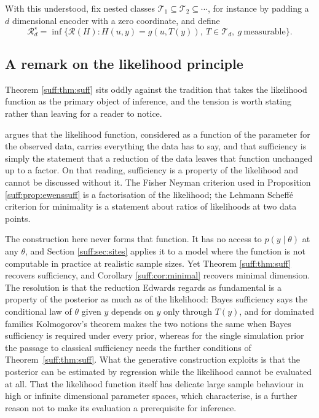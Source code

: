 With this understood, fix nested classes $\mathcal{T}_1\subseteq\mathcal{T}_2\subseteq\cdots$,
for instance by padding a $d$ dimensional encoder with a zero coordinate, and define
\[
\mathcal{R}^\star_d=\inf\{\mathcal{R}(H): H(u,y)=g(u,T(y)),\ T\in\mathcal{T}_d,\ g\
\text{measurable}\}.
\]

\subsection{A remark on the likelihood principle}
\label{suff:sec:edwards}

Theorem \ref{suff:thm:suff} sits oddly against the tradition that takes the likelihood
function as the primary object of inference, and the tension is worth stating rather than
leaving for a reader to notice.

\citet{suff:edwards1972} argues that the likelihood function, considered as a function of the
parameter for the observed data, carries everything the data has to say, and that sufficiency
is simply the statement that a reduction of the data leaves that function unchanged up to a
factor. On that reading, sufficiency is a property of the likelihood and cannot be discussed
without it. The Fisher Neyman criterion used in Proposition \ref{suff:prop:ewenssuff} is a
factorisation of the likelihood; the Lehmann Scheff\'e criterion for minimality is a statement
about ratios of likelihoods at two data points.

The construction here never forms that function. It has no access to $p(y\mid\theta)$ at any
$\theta$, and Section \ref{suff:sec:sites} applies it to a model where the function is not
computable in practice at realistic sample sizes. Yet Theorem \ref{suff:thm:suff} recovers
sufficiency, and Corollary \ref{suff:cor:minimal} recovers minimal dimension. The resolution is
that the reduction Edwards regards as fundamental is a property of the posterior as much as of
the likelihood: Bayes sufficiency says the conditional law of $\theta$ given $y$ depends on
$y$ only through $T(y)$, and for dominated families Kolmogorov's theorem makes the two notions
the same when Bayes sufficiency is required under every prior, whereas for the single simulation prior the passage to classical sufficiency needs the further conditions of Theorem~\ref{suff:thm:suff}. What the generative construction exploits is that the posterior can be estimated by
regression while the likelihood cannot be evaluated at all. That the likelihood function
itself has delicate large sample behaviour in high or infinite dimensional parameter spaces,
which \citet{suff:wongshen1995} characterise, is a further reason not to make its evaluation a
prerequisite for inference.

